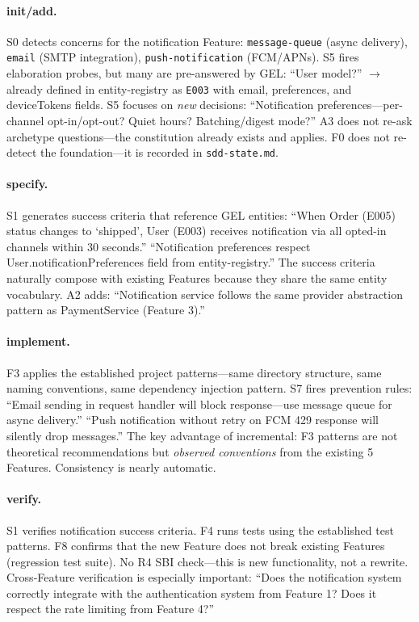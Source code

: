 \documentclass[11pt,a4paper,openright,twoside]{report}
\begin{document}
\paragraph{init/add.}
S0 detects concerns for the notification Feature: \texttt{message-queue} (async delivery), \texttt{email} (SMTP integration), \texttt{push-notification} (FCM/APNs). S5 fires elaboration probes, but many are pre-answered by GEL: ``User model?'' $\to$ already defined in entity-registry as \texttt{E003} with email, preferences, and deviceTokens fields. S5 focuses on \emph{new} decisions: ``Notification preferences---per-channel opt-in/opt-out? Quiet hours? Batching/digest mode?'' A3 does not re-ask archetype questions---the constitution already exists and applies. F0 does not re-detect the foundation---it is recorded in \texttt{sdd-state.md}.

\paragraph{specify.}
S1 generates success criteria that reference GEL entities: ``When Order (E005) status changes to `shipped', User (E003) receives notification via all opted-in channels within 30 seconds.'' ``Notification preferences respect User.notificationPreferences field from entity-registry.'' The success criteria naturally compose with existing Features because they share the same entity vocabulary. A2 adds: ``Notification service follows the same provider abstraction pattern as PaymentService (Feature 3).''

\paragraph{implement.}
F3 applies the established project patterns---same directory structure, same naming conventions, same dependency injection pattern. S7 fires prevention rules: ``Email sending in request handler will block response---use message queue for async delivery.'' ``Push notification without retry on FCM 429 response will silently drop messages.'' The key advantage of incremental: F3 patterns are not theoretical recommendations but \emph{observed conventions} from the existing 5 Features. Consistency is nearly automatic.

\paragraph{verify.}
S1 verifies notification success criteria. F4 runs tests using the established test patterns. F8 confirms that the new Feature does not break existing Features (regression test suite). No R4 SBI check---this is new functionality, not a rewrite. Cross-Feature verification is especially important: ``Does the notification system correctly integrate with the authentication system from Feature 1? Does it respect the rate limiting from Feature 4?''
\end{document}
